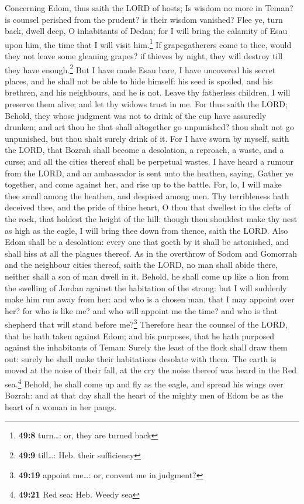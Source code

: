  Concerning Edom, thus saith the LORD of hosts; Is wisdom
no more in Teman? is counsel perished from the prudent? is their wisdom
vanished?  Flee ye, turn back, dwell deep, O inhabitants
of Dedan; for I will bring the calamity of Esau upon him, the time that
I will visit him.\footnote{\textbf{49:8} turn\ldots: or, they are turned
  back}  If grapegatherers come to thee, would they not
leave some gleaning grapes? if thieves by night, they will destroy till
they have enough.\footnote{\textbf{49:9} till\ldots: Heb. their
  sufficiency}  But I have made Esau bare, I have
uncovered his secret places, and he shall not be able to hide himself:
his seed is spoiled, and his brethren, and his neighbours, and he is
not.  Leave thy fatherless children, I will preserve them
alive; and let thy widows trust in me.  For thus saith
the LORD; Behold, they whose judgment was not to drink of the cup have
assuredly drunken; and art thou he that shall altogether go unpunished?
thou shalt not go unpunished, but thou shalt surely drink of it.
 For I have sworn by myself, saith the LORD, that Bozrah
shall become a desolation, a reproach, a waste, and a curse; and all the
cities thereof shall be perpetual wastes.  I have heard a
rumour from the LORD, and an ambassador is sent unto the heathen,
saying, Gather ye together, and come against her, and rise up to the
battle.  For, lo, I will make thee small among the
heathen, and despised among men.  Thy terribleness hath
deceived thee, and the pride of thine heart, O thou that dwellest in the
clefts of the rock, that holdest the height of the hill: though thou
shouldest make thy nest as high as the eagle, I will bring thee down
from thence, saith the LORD.  Also Edom shall be a
desolation: every one that goeth by it shall be astonished, and shall
hiss at all the plagues thereof.  As in the overthrow of
Sodom and Gomorrah and the neighbour cities thereof, saith the LORD, no
man shall abide there, neither shall a son of man dwell in it.
 Behold, he shall come up like a lion from the swelling
of Jordan against the habitation of the strong: but I will suddenly make
him run away from her: and who is a chosen man, that I may appoint over
her? for who is like me? and who will appoint me the time? and who is
that shepherd that will stand before me?\footnote{\textbf{49:19} appoint
  me\ldots: or, convent me in judgment?}  Therefore hear
the counsel of the LORD, that he hath taken against Edom; and his
purposes, that he hath purposed against the inhabitants of Teman: Surely
the least of the flock shall draw them out: surely he shall make their
habitations desolate with them.  The earth is moved at
the noise of their fall, at the cry the noise thereof was heard in the
Red sea.\footnote{\textbf{49:21} Red sea: Heb. Weedy sea}
 Behold, he shall come up and fly as the eagle, and
spread his wings over Bozrah: and at that day shall the heart of the
mighty men of Edom be as the heart of a woman in her pangs.


